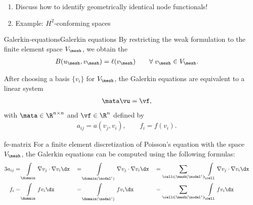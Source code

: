 \begin{todo}
  \begin{enumerate}
  \item Discuss how to identify geometrically identical node functionals!
  \item Example: $H^2$-conforming spaces
  \end{enumerate}
\end{todo}

\begin{Definition}{Galerkin-equations}{Galerkin equations}
  By restricting the weak formulation to the finite element space $V_{\mesh}$, we obtain the 
  \begin{gather}
    B(u_{\mesh},v_{\mesh}) = \ell(v_{\mesh}) \qquad\forall\;v_{\mesh}\in V_{\mesh}. 
  \end{gather}
  
  After choosing a basis $\{v_i\}$ for $V_{\mesh}$, the Galerkin equations are
  equivalent to a linear system
  \begin{gather}
    \mata \vu = \vf,
  \end{gather}
  with $\mata\in\R^{n\times n}$ and $\vf\in \R^n$ defined by
  \begin{gather}
    a_{ij} = a(v_j, v_i), \qquad f_i = f(v_i).
  \end{gather}
\end{Definition}

\begin{Lemma}{fe-matrix}
  For a finite element discretization of Poisson's equation with the
  space $V_\mesh$, the Galerkin equations can be computed using the
  following formulas:
  \begin{alignat*}3
    a_{ij} &= \int\limits_\domain \nabla v_j \cdot \nabla v_i \dx
    &&= \int\limits_{\domain(\nodal^i)} \nabla v_j \cdot \nabla v_i \dx
    &&= \sum_{\cell\in\mesh(\nodal^i)}\int\limits_\cell \nabla v_j \cdot \nabla v_i \dx\\
    f_{i} &= \int\limits_\domain f v_i \dx
    &&= \int\limits_{\domain(\nodal^i)} f v_i \dx
    &&= \sum_{\cell\in\mesh(\nodal^i)}\int\limits_\cell f v_i \dx
  \end{alignat*}
\end{Lemma}

